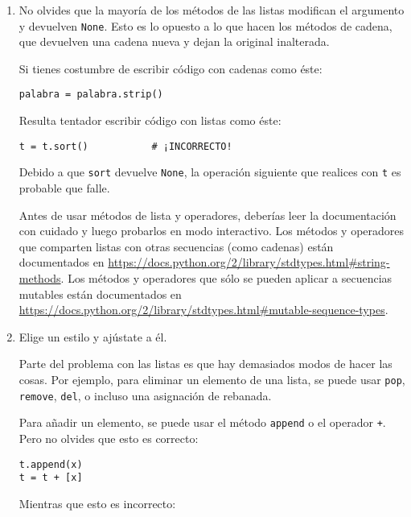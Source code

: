 \begin{enumerate}

\item No olvides que la mayoría de los métodos de las listas modifican el argumento y
devuelven {\tt None}. Esto es lo opuesto a lo que hacen los métodos de cadena,
que devuelven una cadena nueva y dejan la original inalterada.

Si tienes costumbre de escribir código con cadenas como éste:

\beforeverb
\begin{verbatim}
palabra = palabra.strip()
\end{verbatim}
\afterverb

Resulta tentador escribir código con listas como éste:

\beforeverb
\begin{verbatim}
t = t.sort()           # ¡INCORRECTO!
\end{verbatim}
\afterverb


Debido a que {\tt sort} devuelve {\tt None}, la operación
siguiente que realices con {\tt t} es probable que falle.

Antes de usar métodos de lista y operadores, deberías leer la
documentación con cuidado y luego probarlos en modo interactivo. Los
métodos y operadores que comparten listas con otras secuencias (como
cadenas) están documentados en
\url{https://docs.python.org/2/library/stdtypes.html#string-methods}.
Los métodos y operadores que sólo se pueden aplicar a secuencias mutables
están documentados en
\url{https://docs.python.org/2/library/stdtypes.html#mutable-sequence-types}.


\item Elige un estilo y ajústate a él.

Parte del problema con las listas es que hay demasiados
modos de hacer las cosas. Por ejemplo, para eliminar un elemento de
una lista, se puede usar {\tt pop}, {\tt remove}, {\tt del},
o incluso una asignación de rebanada.

Para añadir un elemento, se puede usar el método {\tt append} o
el operador {\tt +}. Pero no olvides que esto es correcto:

\beforeverb
\begin{verbatim}
t.append(x)
t = t + [x]
\end{verbatim}
\afterverb

Mientras que esto es incorrecto:


\end{enumerate}
